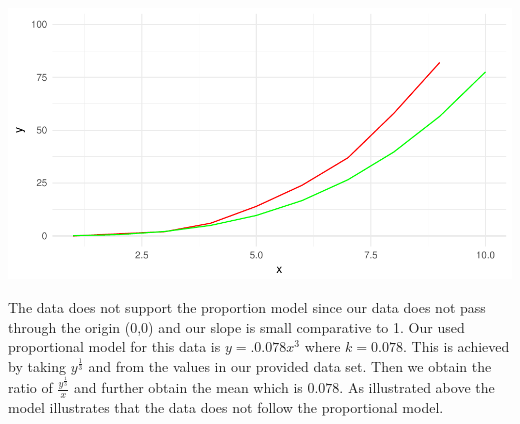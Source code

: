 \documentclass[]{article}
\newenvironment{Shaded}{\begin{snugshade}}{\end{snugshade}}
\newcommand{\KeywordTok}[1]{\textcolor[rgb]{0.13,0.29,0.53}{\textbf{{#1}}}}
\newcommand{\DataTypeTok}[1]{\textcolor[rgb]{0.13,0.29,0.53}{{#1}}}
\newcommand{\DecValTok}[1]{\textcolor[rgb]{0.00,0.00,0.81}{{#1}}}
\newcommand{\StringTok}[1]{\textcolor[rgb]{0.31,0.60,0.02}{{#1}}}
\newcommand{\NormalTok}[1]{{#1}}
\begin{document}
\begin{Shaded}
\end{Shaded}

\includegraphics{CHunt_homework2_files/figure-latex/unnamed-chunk-1-1.pdf}

The data does not support the proportion model since our data does not
pass through the origin (0,0) and our slope is small comparative to 1.
Our used proportional model for this data is \(y = .0.078x^3\) where
\(k = 0.078\). This is achieved by taking \(y^\frac{1}{3}\) and from the
values in our provided data set. Then we obtain the ratio of
\(\frac{y^\frac{1}{3}}{x}\) and further obtain the mean which is
\(0.078\). As illustrated above the model illustrates that the data does
not follow the proportional model.
\end{document}
